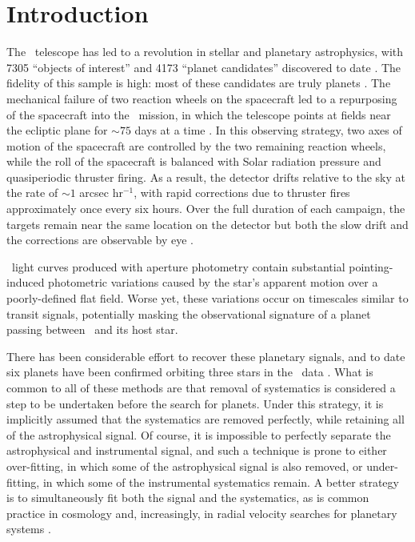 

\section{Introduction}
The \kep\ telescope \citep{Borucki10} has led to a revolution in stellar and planetary
astrophysics, with 7305 ``objects of interest'' and 4173 ``planet candidates''
discovered to date \citep{Borucki11a, Borucki11b, Batalha13, Burke14, Rowe15, Mullally15}.
The fidelity of this sample is high: most of these candidates are truly planets
\citep{Morton11b, Fressin13, Desert15}.
The mechanical failure of two reaction wheels on the spacecraft led to a repurposing
of the spacecraft into the \KT\ mission, in which the telescope points at
fields near the ecliptic plane for $\sim 75$ days at a time \citep{Howell14}.
In this observing strategy, two axes of motion of the spacecraft are
controlled by the two remaining reaction wheels, while the roll of the
spacecraft is balanced with Solar radiation pressure and quasiperiodic
thruster firing.
As a result, the detector drifts relative to the sky
at the rate of $\sim 1$ arcsec hr$^{-1}$, with rapid corrections due to thruster fires
approximately once every six hours.
Over the full duration of each campaign, the targets remain near the
same location on the detector but both the slow drift and the corrections are
observable by eye \citep{Barentsen15}.

\KT\ light curves produced with aperture photometry contain substantial pointing-induced
photometric variations caused by the star's apparent motion over a poorly-defined flat
field.
Worse yet, these variations occur on timescales similar to transit signals, potentially
masking the observational signature of a planet passing between \kep\ and its host star.

There has been considerable effort to recover these planetary signals, and to date six
planets have been confirmed orbiting three stars in the \KT\ data
\citep{Vanderburg15, Crossfield15, Armstrong15b}.
What is common to all of these methods are that removal of systematics is considered a
step to be undertaken before the search for planets.
Under this strategy, it is implicitly assumed that the systematics are removed perfectly,
while retaining all of the astrophysical signal.
Of course, it is impossible to perfectly separate the astrophysical and instrumental
signal, and such a technique is prone to either over-fitting, in which some of the
astrophysical signal is also removed, or under-fitting, in which some
of the instrumental systematics remain.
A better strategy is to simultaneously fit both the signal and the systematics, as is common
practice in cosmology and, increasingly, in radial velocity searches for planetary systems
\citep[e.g.][]{Ferreira00, Boisse11, Haywood14, Grunblatt15}.

